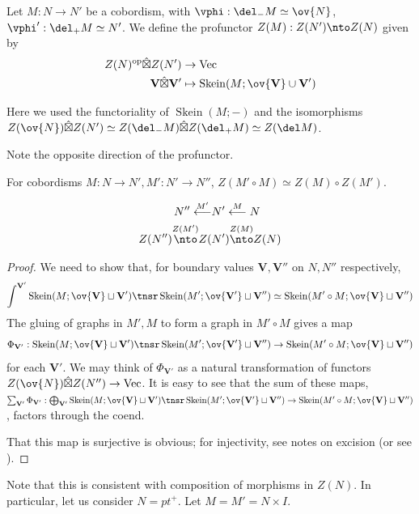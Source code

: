 \documentclass[12pt]{article}
\newcommand{\VV}{{\mathbf{V}}}
\DeclareMathOperator{\Skein}{Skein}
\newcommand{\op}{{\text{op}}}
\newcommand{\hatbox}{{\hat{\boxtimes}}}
\DeclareMathOperator{\Vect}{Vec}
\begin{document}
\begin{definition}
Let $M : N \to N'$ be a cobordism,
with $\vphi: \del_-M \simeq \ov{N}$,
$\vphi': \del_+M \simeq N'$.
We define the profunctor $Z(M): Z(N') \nto Z(N)$
given by
\begin{align*}
Z(N)^\op \hatbox Z(N') &\to \Vect
\\
\VV \hatbox \VV' &\mapsto \Skein(M; \ov{\VV} \cup \VV')
\end{align*}

Here we used the functoriality of $\Skein(M;-)$
and the isomorphisms
$Z(\ov{N}) \hatbox Z(N') \simeq Z(\del_-M) \hatbox Z(\del_+M)
\simeq Z(\del M)$.
\end{definition}

Note the opposite direction of the profunctor.

\begin{proposition}
\label{p:1-cobord-compose}
For cobordisms $M: N \to N', M': N' \to N''$,
$Z(M' \circ M) \simeq Z(M) \circ Z(M')$.

\begin{align*}
N'' \overset{M'}{\longleftarrow}
& N' \overset{M}{\longleftarrow}
N
\\
Z(N'') \overset{Z(M')}{\nto}
Z(& N') \overset{Z(M)}{\nto}
Z(N)
\end{align*}
\end{proposition}

\begin{proof}
We need to show that, for boundary values
$\VV,\VV''$ on $N,N''$ respectively,
\[
\int^{\VV'}
\Skein(M; \ov{\VV} \sqcup \VV')
\tnsr
\Skein(M';\ov{\VV'} \sqcup \VV'')
\simeq \Skein(M' \circ M; \ov{\VV} \sqcup \VV'')
\]
The gluing of graphs in $M',M$ to form a graph in
$M' \circ M$ gives a map
\[
\Phi_{\VV'}:
\Skein(M; \ov{\VV} \sqcup \VV')
\tnsr
\Skein(M';\ov{\VV'} \sqcup \VV'')
\to \Skein(M' \circ M; \ov{\VV} \sqcup \VV'')
\]
for each $\VV'$.
We may think of $\Phi_{\VV'}$
as a natural transformation of functors
$Z(\ov{N}) \hatbox Z(N'') \to \Vect$.
It is easy to see that the sum of these maps,
$\sum_{\VV'} \Phi_{\VV'}:
\bigoplus_{\VV'}
\Skein(M; \ov{\VV} \sqcup \VV')
\tnsr
\Skein(M';\ov{\VV'} \sqcup \VV'')
\to \Skein(M' \circ M; \ov{\VV} \sqcup \VV'')$,
factors through the coend.

That this map is surjective is obvious;
for injectivity, see notes on excision
(or see \cite{KT}).
\end{proof}


Note that this is consistent with
composition of morphisms in $Z(N)$.
In particular, let us consider $N = pt^+$.
Let $M = M' = N \times I$.
\end{document}
